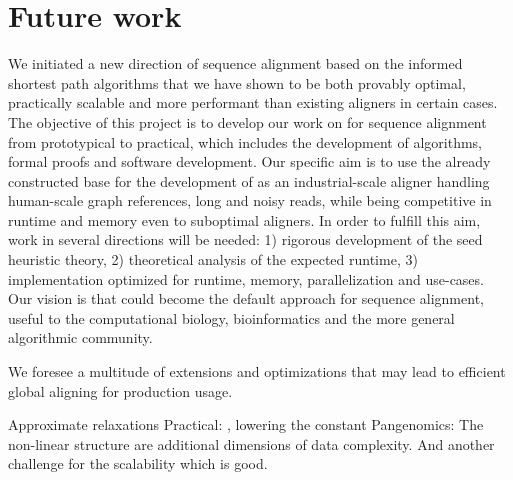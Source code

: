 \section{Future work}

We initiated a new direction of sequence alignment based on the informed
shortest path algorithms \A that we have shown to be both provably optimal,
practically scalable and more performant than existing aligners in certain
cases. The objective of this project is to develop our work on \A for sequence
alignment from prototypical to practical, which includes the development of
algorithms, formal proofs and software development. Our specific aim is to use
the already constructed base for the development of \astarix as an
industrial-scale aligner handling human-scale graph references, long and noisy
reads, while being competitive in runtime and memory even to suboptimal
aligners. In order to fulfill this aim, work in several directions will be
needed: 1) rigorous development of the seed heuristic theory, 2) theoretical
analysis of the expected runtime, 3) implementation optimized for runtime,
memory, parallelization and use-cases. Our vision is that \A could become the
default approach for sequence alignment, useful to the computational biology,
bioinformatics and the more general algorithmic community.

We foresee a multitude of extensions and optimizations that may lead to
efficient global aligning for production usage.

Approximate relaxations
Practical: , lowering the \A constant
Pangenomics: The non-linear structure are additional dimensions of data complexity. And
another challenge for the scalability which is good.

